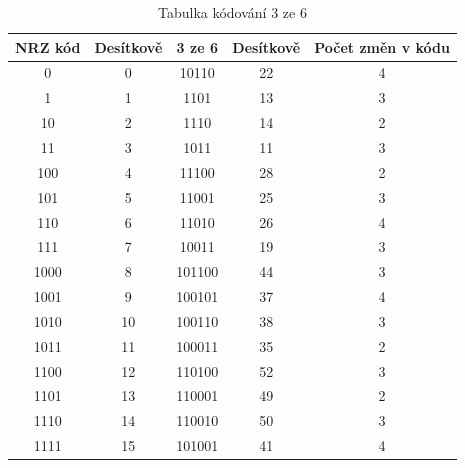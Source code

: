 \begin{table}[!ht]
\centering
\caption{Tabulka kódování 3 ze 6 \cite{WMencodeing}}
\begin{tabular}{|c|c|c|c|c|}
\hline
\textbf{NRZ kód} & \textbf{Desítkově} & \textbf{3 ze 6} & \textbf{Desítkově} & \textbf{Počet změn v kódu} \\ \hline \hline
0                & 0                  & 10110               & 22                 & 4                          \\ \hline
1                & 1                  & 1101                & 13                 & 3                          \\ \hline
10               & 2                  & 1110                & 14                 & 2                          \\ \hline
11               & 3                  & 1011                & 11                 & 3                          \\ \hline
100              & 4                  & 11100               & 28                 & 2                          \\ \hline
101              & 5                  & 11001               & 25                 & 3                          \\ \hline
110              & 6                  & 11010               & 26                 & 4                          \\ \hline
111              & 7                  & 10011               & 19                 & 3                          \\ \hline
1000             & 8                  & 101100              & 44                 & 3                          \\ \hline
1001             & 9                  & 100101              & 37                 & 4                          \\ \hline
1010             & 10                 & 100110              & 38                 & 3                          \\ \hline
1011             & 11                 & 100011              & 35                 & 2                          \\ \hline
1100             & 12                 & 110100              & 52                 & 3                          \\ \hline
1101             & 13                 & 110001              & 49                 & 2                          \\ \hline
1110             & 14                 & 110010              & 50                 & 3                          \\ \hline
1111             & 15                 & 101001              & 41                 & 4                          \\ \hline \hline
\end{tabular}
\end{table}

